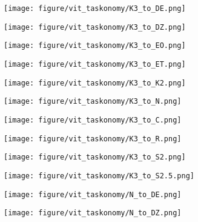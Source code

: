 \begin{figure}[h]
\begin{subfigure}{\figlength\textwidth}
\end{subfigure}
\begin{subfigure}{\figlength\textwidth}
\texttt{[image: figure/vit\_taskonomy/K3\_to\_DE.png]}
\end{subfigure}
\begin{subfigure}{\figlength\textwidth}
\texttt{[image: figure/vit\_taskonomy/K3\_to\_DZ.png]}
\end{subfigure}
\begin{subfigure}{\figlength\textwidth}
\texttt{[image: figure/vit\_taskonomy/K3\_to\_EO.png]}
\end{subfigure}
\begin{subfigure}{\figlength\textwidth}
\texttt{[image: figure/vit\_taskonomy/K3\_to\_ET.png]}
\end{subfigure}
\begin{subfigure}{\figlength\textwidth}
\texttt{[image: figure/vit\_taskonomy/K3\_to\_K2.png]}
\end{subfigure}
\begin{subfigure}{\figlength\textwidth}
\texttt{[image: figure/vit\_taskonomy/K3\_to\_N.png]}
\end{subfigure}
\begin{subfigure}{\figlength\textwidth}
\texttt{[image: figure/vit\_taskonomy/K3\_to\_C.png]}
\end{subfigure}
\begin{subfigure}{\figlength\textwidth}
\texttt{[image: figure/vit\_taskonomy/K3\_to\_R.png]}
\end{subfigure}
\begin{subfigure}{\figlength\textwidth}
\texttt{[image: figure/vit\_taskonomy/K3\_to\_S2.png]}
\end{subfigure}
\begin{subfigure}{\figlength\textwidth}
\texttt{[image: figure/vit\_taskonomy/K3\_to\_S2.5.png]}
\end{subfigure}
\begin{subfigure}{\figlength\textwidth}
\texttt{[image: figure/vit\_taskonomy/N\_to\_DE.png]}
\end{subfigure}
\begin{subfigure}{\figlength\textwidth}
\texttt{[image: figure/vit\_taskonomy/N\_to\_DZ.png]}
\end{subfigure}
\begin{subfigure}{\figlength\textwidth}

\end{subfigure}
\end{figure}
